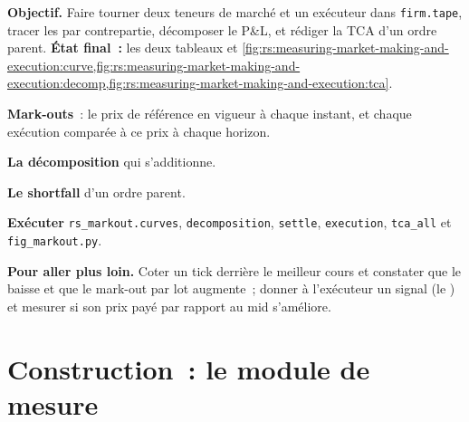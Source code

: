 \begin{tutorial}
\textbf{Objectif.} Faire tourner deux teneurs de marché et un exécuteur dans \texttt{firm.tape}, tracer les  par contrepartie, décomposer le P\&L, et rédiger
la TCA d'un ordre parent. \textbf{État final~:} les deux tableaux et
\cref{fig:rs:measuring-market-making-and-execution:curve,fig:rs:measuring-market-making-and-execution:decomp,fig:rs:measuring-market-making-and-execution:tca}.
\begin{tutsteps}
\item \textbf{Mark-outs}~: le prix de référence en vigueur à chaque instant, et chaque exécution comparée à ce prix à chaque horizon.
\label{lst:rs:measuring-market-making-and-execution:markouts}
\item \textbf{La décomposition} qui s'additionne.
\label{lst:rs:measuring-market-making-and-execution:decompose}
\item \textbf{Le shortfall} d'un ordre parent.
\label{lst:rs:measuring-market-making-and-execution:shortfall}
\item \textbf{Exécuter} \texttt{rs\_markout.curves}, \texttt{decomposition}, \texttt{settle}, \texttt{execution}, \texttt{tca\_all} et \texttt{fig\_markout.py}.
\end{tutsteps}
\textbf{Pour aller plus loin.} Coter un tick derrière le meilleur cours et constater que le  baisse et que le mark-out par lot augmente~; donner à l'exécuteur un signal (le
) et mesurer si son prix payé par rapport au mid s'améliore.
\end{tutorial}

\section{Construction~: le module de mesure}\label{bld:rs:measuring-market-making-and-execution:markout}

